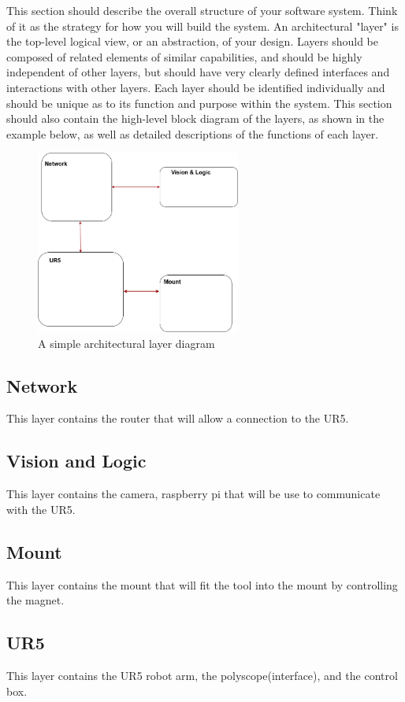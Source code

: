 This section should describe the overall structure of your software system. Think of it as the strategy for how you will build the system. An architectural "layer" is the top-level logical view, or an abstraction, of your design. Layers should be composed of related elements of similar capabilities, and should be highly independent of other layers, but should have very clearly defined interfaces and interactions with other layers. Each layer should be identified individually and should be unique as to its function and purpose within the system. This section should also contain the high-level block diagram of the layers, as shown in the example below, as well as detailed descriptions of the functions of each layer.

\begin{figure}[h!]
	\centering
 	\includegraphics[width=0.60\textwidth]{images/ADS_layers}
 \caption{A simple architectural layer diagram}
\end{figure}

\subsection{Network}
This layer contains the router that will allow a connection to the UR5.

\subsection{Vision and Logic}
This layer contains the camera, raspberry pi that will be use to communicate with the UR5.

\subsection{Mount}
This layer contains the mount that will fit the tool into the mount by controlling the magnet.

\subsection{UR5}
This layer contains the UR5 robot arm, the polyscope(interface), and the control box.